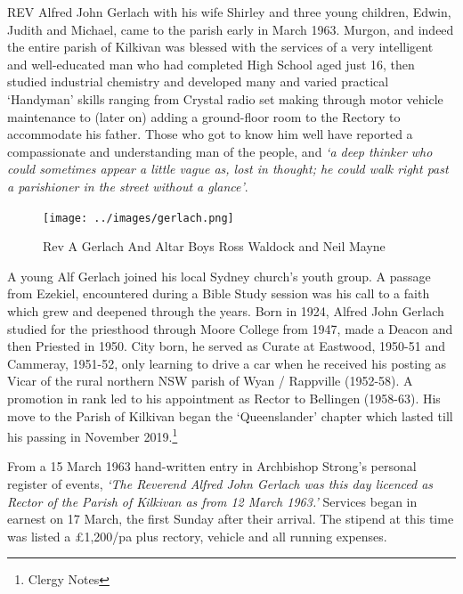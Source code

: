 \lettrine[lines=3]{R}{EV}
 Alfred John Gerlach with his wife Shirley and three young children, Edwin, Judith and Michael, came to the parish early in March 1963. Murgon, and indeed the entire parish of Kilkivan was blessed with the services of a very intelligent and well-educated man who had completed High School aged just 16, then studied industrial chemistry and developed many and varied practical `Handyman' skills ranging from Crystal radio set making through motor vehicle maintenance to (later on) adding a ground-floor room to the Rectory to accommodate his father. Those who got to know him well have reported a compassionate and understanding man of the people, and \emph{`a deep thinker who could sometimes appear a little vague as, lost in thought; he could walk right past a parishioner in the street without a glance'}.







\begin{figure}[!htb]
\begin{center}
\texttt{[image: ../images/gerlach.png]}
\caption{Rev A Gerlach And Altar Boys Ross Waldock and Neil Mayne}
\end{center}
\end{figure}




A young Alf Gerlach joined his local Sydney church's youth group. A passage from Ezekiel, encountered during a Bible Study session was his call to a faith which grew and deepened through the years. Born in 1924, Alfred John Gerlach studied for the priesthood through Moore College from 1947, made a Deacon and then Priested in 1950. City born, he served as Curate at Eastwood, 1950-51 and Cammeray, 1951-52, only learning to drive a car when he received his posting as Vicar of the rural northern NSW parish of Wyan / Rappville (1952-58). A promotion in rank led to his appointment as Rector to Bellingen (1958-63). His move to the Parish of Kilkivan began the `Queenslander' chapter which lasted till his passing in November 2019.\footnote{Clergy Notes}


From a 15 March 1963 hand-written entry in Archbishop Strong's personal register of events, \emph{`The Reverend Alfred John Gerlach was this day licenced as Rector of the Parish of Kilkivan as from 12 March 1963.'} Services began in earnest on 17 March, the first Sunday after their arrival. The stipend at this time was listed a \pounds1,200/pa plus rectory, vehicle and all running expenses.









